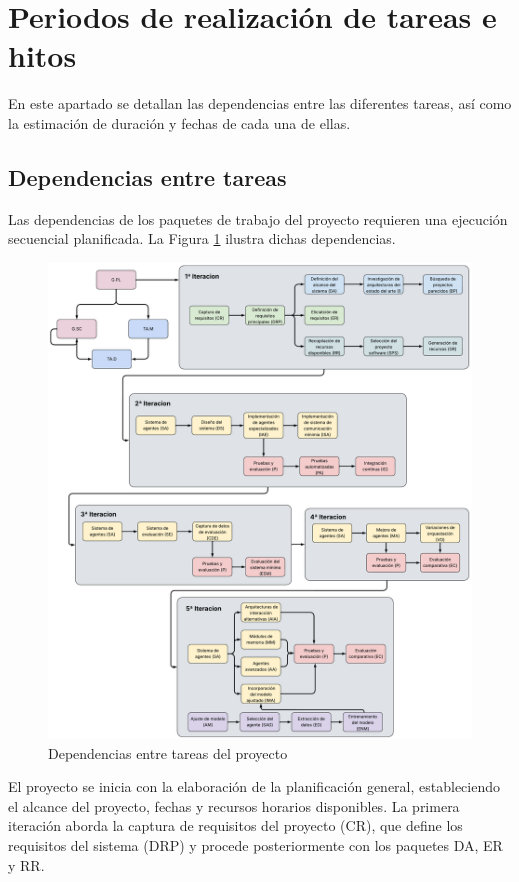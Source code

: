 \section{Periodos de realización de tareas e hitos}
En este apartado se detallan las dependencias entre las diferentes tareas, así como la estimación de duración y fechas de cada una de ellas.

\subsection{Dependencias entre tareas}
Las dependencias de los paquetes de trabajo del proyecto requieren una ejecución secuencial planificada. La Figura \ref{fig:dependencias} ilustra dichas dependencias.


\begin{figure}[h]
  \centering
  \hspace{-3.45cm}\includegraphics[scale=0.4325]{figures/dep_mod.pdf}%
  \caption{Dependencias entre tareas del proyecto}
  \label{fig:dependencias}
\end{figure}

El proyecto se inicia con la elaboración de la planificación general, estableciendo el alcance del proyecto, fechas y recursos horarios disponibles. La primera iteración aborda la captura de requisitos del proyecto (CR), que define los requisitos del sistema (DRP) y procede posteriormente con los paquetes DA, ER y RR.

